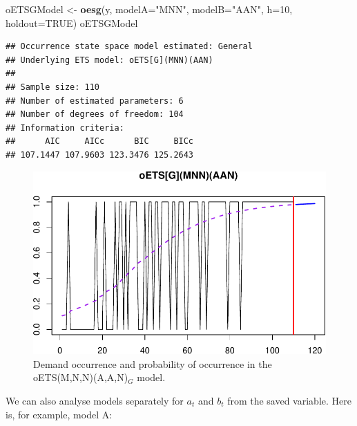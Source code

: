 \documentclass[]{book}
\newenvironment{Shaded}{\begin{snugshade}}{\end{snugshade}}
\newcommand{\DataTypeTok}[1]{\textcolor[rgb]{0.13,0.29,0.53}{#1}}
\newcommand{\DecValTok}[1]{\textcolor[rgb]{0.00,0.00,0.81}{#1}}
\newcommand{\KeywordTok}[1]{\textcolor[rgb]{0.13,0.29,0.53}{\textbf{#1}}}
\newcommand{\NormalTok}[1]{#1}
\newcommand{\OperatorTok}[1]{\textcolor[rgb]{0.81,0.36,0.00}{\textbf{#1}}}
\newcommand{\OtherTok}[1]{\textcolor[rgb]{0.56,0.35,0.01}{#1}}
\newcommand{\StringTok}[1]{\textcolor[rgb]{0.31,0.60,0.02}{#1}}
\theoremstyle{definition}
\theoremstyle{definition}
\theoremstyle{definition}
\theoremstyle{definition}
\theoremstyle{remark}
\begin{document}
\begin{Shaded}
\begin{Highlighting}[]
\NormalTok{oETSGModel <-}\StringTok{ }\KeywordTok{oesg}\NormalTok{(y, }\DataTypeTok{modelA=}\StringTok{"MNN"}\NormalTok{, }\DataTypeTok{modelB=}\StringTok{"AAN"}\NormalTok{,}
                   \DataTypeTok{h=}\DecValTok{10}\NormalTok{, }\DataTypeTok{holdout=}\OtherTok{TRUE}\NormalTok{)}
\NormalTok{oETSGModel}
\end{Highlighting}
\end{Shaded}

\begin{verbatim}
## Occurrence state space model estimated: General
## Underlying ETS model: oETS[G](MNN)(AAN)
## 
## Sample size: 110
## Number of estimated parameters: 6
## Number of degrees of freedom: 104
## Information criteria: 
##      AIC     AICc      BIC     BICc 
## 107.1447 107.9603 123.3476 125.2643
\end{verbatim}

\begin{figure}
\centering
\includegraphics{Svetunkov--2022----ADAM_files/figure-latex/oETSGModel-1.pdf}
\caption{\label{fig:oETSGModel}Demand occurrence and probability of occurrence in the oETS(M,N,N)(A,A,N)\(_G\) model.}
\end{figure}

We can also analyse models separately for \(a_t\) and \(b_t\) from the saved variable. Here is, for example, model A:

\begin{Shaded}
\end{Shaded}
\end{document}
